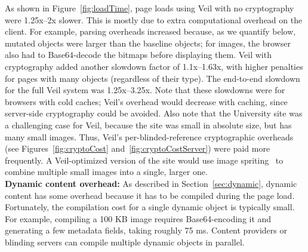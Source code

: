 As shown in Figure~\ref{fig:loadTime}, page loads using Veil with
no cryptography were 1.25x--2x slower. This is mostly
due to extra computational overhead on the client.
For example, parsing overheads increased because,
as we quantify below, mutated objects were larger than
the baseline objects; for images, the browser also
had to Base64-decode the bitmaps before displaying
them.
Veil with cryptography added another slowdown factor
of 1.1x--1.63x, with higher penalties for pages
with many objects (regardless of their type). The
end-to-end slowdown for the full Veil system
was 1.25x--3.25x. Note that these slowdowns were for
browsers with cold caches; 
Veil's overhead would
decrease with caching, since server-side
cryptography could be avoided. Also note that
the University site was a challenging case for
Veil, because the site was small in absolute size,
but has many small images. Thus,
Veil's per-blinded-reference cryptographic
overheads (see Figures~\ref{fig:cryptoCost} and~\ref{fig:cryptoCostServer}) %
were paid more frequently. A Veil-optimized
version of the site would use image spriting~\cite{spriting}
to combine multiple small images into a single,
larger one.\\

\noindent
\textbf{Dynamic content overhead:}
As described in Section~\ref{sec:dynamic},
dynamic content has some overhead because it
has to be compiled during the page load.
Fortunately, the compilation cost for a single dynamic object
is typically small. For example, compiling a
100 KB image requires Base64-encoding it and
generating a few metadata fields, taking roughly
75 ms. Content providers or blinding servers 
can compile multiple dynamic objects in parallel. \\

